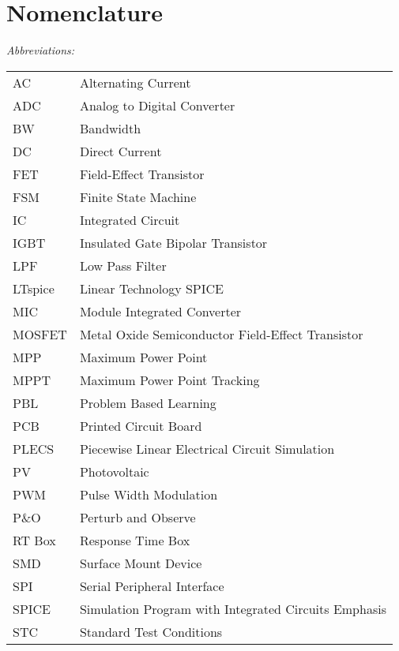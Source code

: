 \chapter*{Nomenclature}


 

\vspace{-10mm} %
\textit{Abbreviations:}\newline
\begin{tabular}{ll} %
AC & Alternating Current\\
ADC & Analog to Digital Converter \\
BW & Bandwidth \\
DC & Direct Current\\
FET & Field-Effect Transistor\\
FSM & Finite State Machine \\
IC & Integrated Circuit\\
IGBT & Insulated Gate Bipolar Transistor \\
LPF & Low Pass Filter\\
LTspice & Linear Technology SPICE \\
MIC & Module Integrated Converter\\
MOSFET & Metal Oxide Semiconductor Field-Effect Transistor\\
MPP & Maximum Power Point\\
MPPT & Maximum Power Point Tracking\\
PBL & Problem Based Learning\\
PCB & Printed Circuit Board\\
PLECS & Piecewise Linear Electrical Circuit Simulation\\
PV & Photovoltaic\\
PWM & Pulse Width Modulation\\
P\&O & Perturb and Observe\\
RT Box & Response Time Box \\
SMD & Surface Mount Device \\
SPI & Serial Peripheral Interface\\
SPICE & Simulation Program with Integrated Circuits Emphasis \\
STC & Standard Test Conditions\\
\end{tabular}

